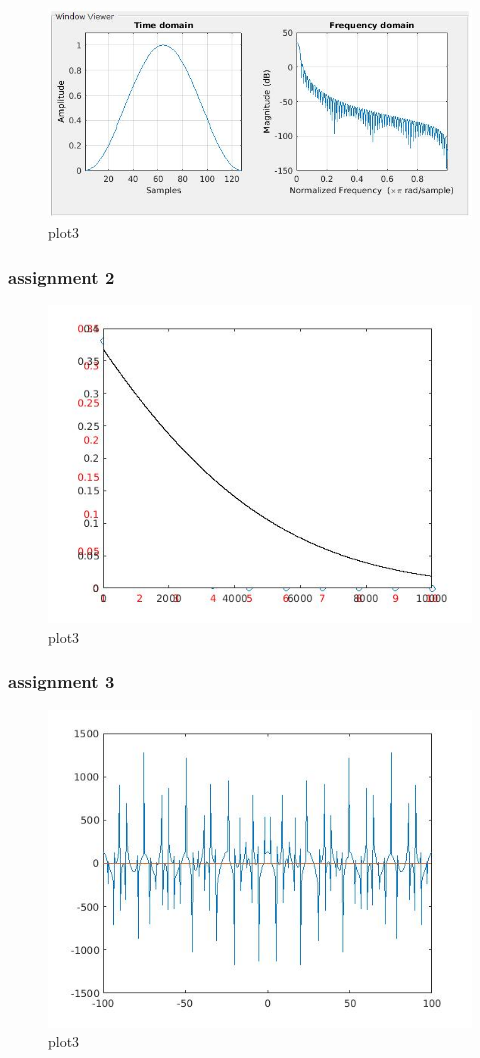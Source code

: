 \documentclass{article}
\begin{document}
\begin{figure}[h!]
    \centering
    \includegraphics[scale=0.4]{fig5.jpg}
    \caption{plot3}
    \label{fig:plot3}
\end{figure}
\newpage
\newpage
\newpage

\subsubsection{assignment 2}


\begin{figure}[h!]
    \centering
    \includegraphics[scale=0.5]{fig6.jpg}
    \caption{plot3}
    \label{fig:plot3}
\end{figure}

\newpage
\subsubsection{assignment 3}
\begin{figure}[h!]
    \centering
    \includegraphics[scale=0.5]{fig7.jpg}
    \caption{plot3}
    \label{fig:plot3}
\end{figure}
\end{document}
